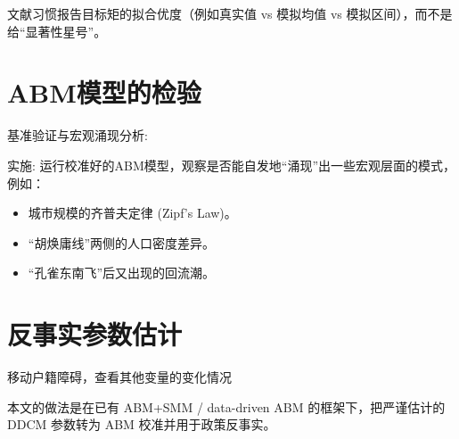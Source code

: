 \documentclass[master, final]{zufe-thesis}
\begin{document}
文献习惯报告目标矩的拟合优度（例如真实值 vs 模拟均值 vs 模拟区间），而不是给“显著性星号”。







\section{ABM模型的检验} %
\label{sub:abm模型的检验}


基准验证与宏观涌现分析:

实施: 运行校准好的ABM模型，观察是否能自发地“涌现”出一些宏观层面的模式，例如：
\begin{itemize}
  \item 城市规模的齐普夫定律 (Zipf's Law)。
  \item “胡焕庸线”两侧的人口密度差异。
  \item “孔雀东南飞”后又出现的回流潮。
\end{itemize}










\section{反事实参数估计}


移动户籍障碍，查看其他变量的变化情况


本文的做法是在已有 ABM+SMM / data-driven ABM 的框架下，把严谨估计的 DDCM 参数转为 ABM 校准并用于政策反事实。
\end{document}
